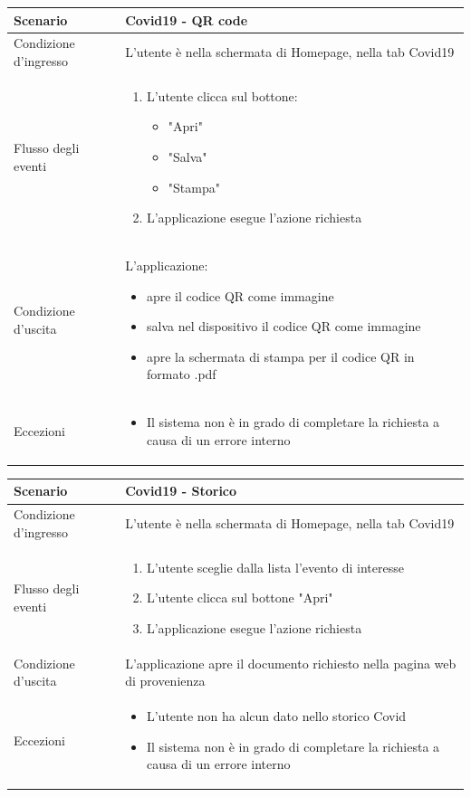 \documentclass[12pt,a4paper,twoside,openright,titlepage]{book}
\begin{document}
\begin{table}[H]
\centering
\begin{tabular}{|p{4cm}|p{10cm}|}
\hline
Scenario & Covid19 - QR code\\
\hline
Condizione d'ingresso & L'utente è nella schermata di Homepage, nella tab Covid19\\
\hline
Flusso degli eventi & 
\begin{enumerate}
\item L'utente clicca sul bottone:
\begin{itemize}
\item "Apri"
\item "Salva"
\item "Stampa"
\end{itemize}
\item L'applicazione esegue l'azione richiesta
\end{enumerate}\\
\hline
Condizione d'uscita & L'applicazione:
\begin{itemize}
\item apre il codice QR come immagine
\item salva nel dispositivo il codice QR come immagine
\item apre la schermata di stampa per il codice QR in formato .pdf
\end{itemize}\\
\hline
Eccezioni & 
\begin{itemize}
\item Il sistema non è in grado di completare la richiesta a causa di un errore interno
\end{itemize} \\
\hline
\end{tabular}
\end{table}

\begin{table}[H]
\centering
\begin{tabular}{|p{4cm}|p{10cm}|}
\hline
Scenario & Covid19 - Storico\\
\hline
Condizione d'ingresso & L'utente è nella schermata di Homepage, nella tab Covid19\\
\hline
Flusso degli eventi & 
\begin{enumerate}
\item L'utente sceglie dalla lista l'evento di interesse
\item L'utente clicca sul bottone "Apri"
\item L'applicazione esegue l'azione richiesta
\end{enumerate}\\
\hline
Condizione d'uscita & L'applicazione apre il documento richiesto nella pagina web di provenienza\\
\hline
Eccezioni & 
\begin{itemize}
\item L'utente non ha alcun dato nello storico Covid
\item Il sistema non è in grado di completare la richiesta a causa di un errore interno
\end{itemize} \\
\hline
\end{tabular}
\end{table}
\end{document}

